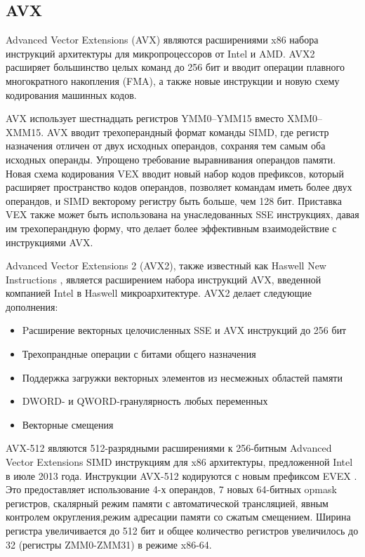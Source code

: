 \subsection{AVX}
Advanced Vector Extensions (AVX) являются расширениями x86 набора инструкций архитектуры для микропроцессоров от Intel и AMD\cite{bib2}.  AVX2 расширяет большинство целых команд до 256 бит и вводит операции плавного многократного накопления (FMA), а также новые инструкции и новую схему кодирования машинных кодов.

AVX использует шестнадцать регистров YMM0--YMM15 вместо XMM0--XMM15. AVX вводит трехоперандный формат команды SIMD, где регистр назначения отличен от двух исходных операндов, сохраняя тем самым оба исходных операнды.
Упрощено требование выравнивания операндов памяти\cite{bib2}. Новая схема кодирования VEX вводит новый набор кодов префиксов, который расширяет пространство кодов операндов, позволяет командам иметь более двух операндов, и SIMD векторому регистру быть больше, чем 128 бит. Приставка VEX также может быть использована на унаследованных SSE инструкциях, давая им трехоперандную форму, что делает более эффективным взаимодействие с инструкциями AVX.

Advanced Vector Extensions 2 (AVX2), также известный как Haswell New Instructions \cite{bib6},  является расширением набора инструкций AVX, введенной компанией Intel в Haswell микроархитектуре. AVX2 делает следующие дополнения:
\begin{itemize}
\item Pасширение векторных целочисленных SSE и AVX инструкций до 256 бит
\item Трехопрандные операции с битами общего назначения
\item Поддержка загружки векторных элементов из несмежных областей памяти
\item DWORD- и QWORD-гранулярность любых переменных
\item Векторные смещения
\end{itemize}

AVX-512 являются 512-разрядными расширениями к 256-битным Advanced Vector Extensions SIMD инструкциям для x86 архитектуры, предложенной Intel в июле 2013 года. Инструкции AVX-512 кодируются с новым префиксом EVEX . Это предоставляет использование 4-х операндов, 7 новых 64-битных opmask регистров, скалярный режим памяти с автоматической трансляцией, явным контролем округления,режим адресации памяти со сжатым смещением. Ширина регистра увеличивается до 512 бит и общее количество регистров увеличилось до 32 (регистры ZMM0-ZMM31) в режиме x86-64.

